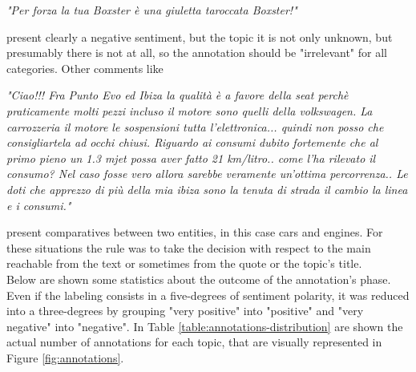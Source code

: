 \begin{description}
	\item \textit{"Per forza la tua Boxster è una giuletta taroccata Boxster!"}
\end{description}

present clearly a negative sentiment, but the topic it is not only unknown, but presumably there is not at all, so the annotation should be "irrelevant" for all categories. Other comments like

\begin{description}
	\item \textit{"Ciao!!! Fra Punto Evo ed Ibiza la qualità è a favore della seat perchè praticamente molti pezzi incluso il motore sono quelli della volkswagen. La carrozzeria il motore le sospensioni tutta l'elettronica... quindi non posso che consigliartela ad occhi chiusi. Riguardo ai consumi dubito fortemente che al primo pieno un 1.3 mjet possa aver fatto 21 km/litro.. come l'ha rilevato il consumo? Nel caso fosse vero allora sarebbe veramente un'ottima percorrenza.. Le doti che apprezzo di più della mia ibiza sono la tenuta di strada il cambio la linea e i consumi."}
\end{description}

present comparatives between two entities, in this case cars and engines. For these situations the rule was to take the decision with respect to the main reachable from the text or sometimes from the quote or the topic's title.\\

Below are shown some statistics about the outcome of the annotation's phase. Even if the labeling consists in a five-degrees of sentiment polarity, it was reduced into a three-degrees by grouping "very positive" into "positive" and "very negative" into "negative".
In Table \ref{table:annotations-distribution} are shown the actual number of annotations for each topic, that are visually represented in Figure \ref{fig:annotations}.


